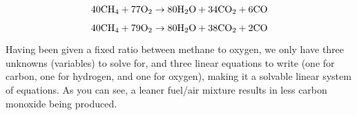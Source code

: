 $$40\hbox{CH}_4 + 77\hbox{O}_2 \to 80\hbox{H}_2\hbox{O} + 34\hbox{CO}_2 + 6\hbox{CO}$$

$$40\hbox{CH}_4 + 79\hbox{O}_2 \to 80\hbox{H}_2\hbox{O} + 38\hbox{CO}_2 + 2\hbox{CO}$$

Having been given a fixed ratio between methane to oxygen, we only have three unknowns (variables) to solve for, and three linear equations to write (one for carbon, one for hydrogen, and one for oxygen), making it a solvable linear system of equations.  As you can see, a leaner fuel/air mixture results in less carbon monoxide being produced.











